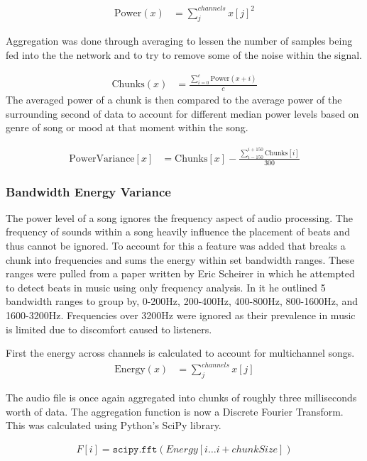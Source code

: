 \documentclass[12pt]{article}
\begin{document}
\begin{align*}
 	\text{Power}(x) &= \sum_j^{channels} x[j]^2
 \end{align*}

Aggregation was done through averaging to lessen the number of samples being fed into the the network and to try to remove some of the noise within the signal.

\begin{align*}
	\text{Chunks}(x) &= \frac{\sum_{i=0}^{c}\text{Power}(x+i)}{c}
\end{align*}
The averaged power of a chunk is then compared to the average power of the surrounding second of data to account for different median power levels based on genre of song or mood at that moment within the song.

\begin{align*}
	\text{PowerVariance}[x] &= \text{Chunks}[x] - \frac{\sum_{i-150}^{i+150}\text{Chunks}[i]}{300}
\end{align*}

\subsubsection{Bandwidth Energy Variance}
The power level of a song ignores the frequency aspect of audio processing. The frequency of sounds within a song heavily influence the placement of beats and thus cannot be ignored. To account for this a feature was added that breaks a chunk into frequencies and sums the energy within set bandwidth ranges. These ranges were pulled from a paper written by Eric Scheirer in which he attempted to detect beats in music using only frequency analysis. In it he outlined 5 bandwidth ranges to group by, 0-200Hz, 200-400Hz, 400-800Hz, 800-1600Hz, and 1600-3200Hz\cite{bandwidthbreaks}. Frequencies over 3200Hz were ignored as their prevalence in music is limited due to discomfort caused to listeners.

First the energy across channels is calculated to account for multichannel songs.
\begin{align*}
 	\text{Energy}(x) &= \sum_j^{channels} x[j]
 \end{align*}

 The audio file is once again aggregated into chunks of roughly three milliseconds worth of data. The aggregation function is now a Discrete Fourier Transform. This was calculated using Python's SciPy library.

 \begin{align*}
 	F[i] =  \texttt{scipy.fft}(Energy[i \dots i+chunkSize])
 \end{align*}
\end{document}
